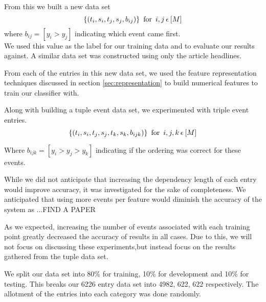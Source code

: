 \documentclass[bsc,frontabs,twoside,singlespacing,parskip,deptreport]{infthesis}     %
\begin{document}
    From this we built a new data set
    \begin{equation}
      \{(t_{i},s_{i},t_{j},s_{j},b_{ij})\} \hspace{0.5em} \text{for} \hspace{0.5em} i,j \hspace{0.2em}\epsilon \hspace{0.2em}[M]\nonumber
    \end{equation}
    where $b_{ij} = [y_{i} > y_{j}]$ indicating which event came first.\\
    We used this value as the label for our training data and to evaluate our results against.
    A similar data set was constructed using only the article headlines.
    
    From each of the entries in this new data set, we used the feature representation techniques discussed in section \ref{sec:representation} to build numerical
    features to train our classifier with.

Along with building a tuple event data set, we experimented with triple event entries.
\begin{equation}
      \{(t_{i},s_{i},t_{j},s_{j},t_{k},s_{k},b_{ijk})\} \hspace{0.5em} \text{for} \hspace{0.5em} i,j,k \hspace{0.2em}\epsilon \hspace{0.2em}[M]\nonumber
\end{equation}

Where $b_{ijk} = [y_i > y_j > y_k]$ indicating if the ordering was correct for these events.

While we did not anticipate that increasing the dependency length of each entry would improve accuracy, it was investigated
for the sake of completeness. We anticipated that using more events per feature would diminish the accuracy of the system as
...FIND A PAPER

As we expected, increasing the number of events associated with each training point greatly decreased the accuracy of results in all cases.
Due to this, we will not focus on discussing these experiments,but instead focus on the results gathered from the tuple data set.

We split our data set into 80\% for training, 10\% for development and 10\% for testing.
This breaks our 6226 entry data set into 4982, 622, 622 respectively.
The allotment of the entries into each category was done randomly.
\end{document}
